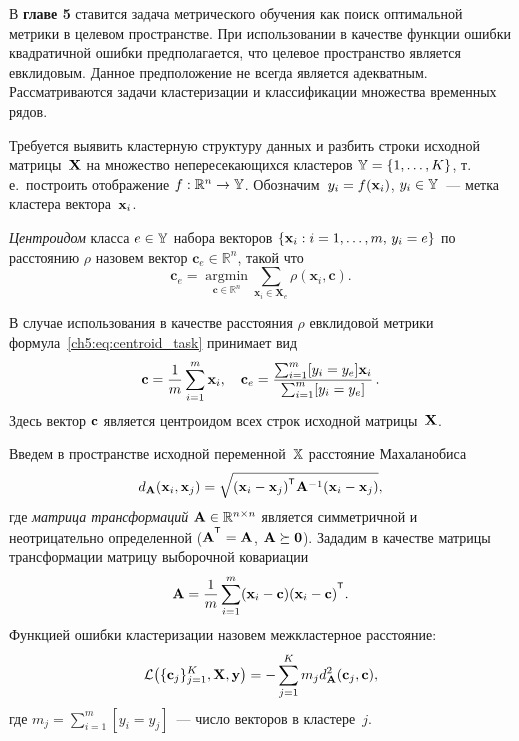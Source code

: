 \documentclass[11pt, a5paper]{dissert}
\begin{document}
В \textbf{главе 5} ставится задача метрического обучения как поиск оптимальной метрики в целевом пространстве.
При использовании в качестве функции ошибки квадратичной ошибки предполагается, что целевое пространство является евклидовым. 
Данное предположение не всегда является адекватным.
Рассматриваются задачи кластеризации и классификации множества временных рядов.

Требуется выявить кластерную структуру данных и разбить строки исходной матрицы~$\mathbf{X}$ на множество непересекающихся кластеров $\mathbb{Y} = \{1, \dots, K\}$, т.\,е.\ построить отображение $f: \mathbb{R}^n \to \mathbb{Y}$.
Обозначим~$y_i = f (\mathbf{x}_i)$, $y_i \in \mathbb{Y}$~--- метка кластера вектора~$\mathbf{x}_i$.
\begin{definition}
	\label{ch5:def:centroid}
	\textit{Центроидом} класса $e \in \mathbb{Y}$ набора векторов $\{\mathbf{x}_i: i=1, \dots, m, \, y_i=e\}$ по расстоянию $\rho$ назовем вектор $\mathbf{c}_e \in \mathbb{R}^n$, такой что
	\begin{equation}
		\label{ch5:eq:centroid_task}
		\mathbf{c}_e = \mathop{\text{argmin}}\limits_{{\mathbf{c} \in \mathbb{R}^n}}\sum_{\mathbf{x}_i \in \mathbf{X}_e}
		{\rho(\mathbf{x}_i ,\mathbf{c})}.
	\end{equation}
\end{definition}
В случае использования в качестве расстояния $\rho$ евклидовой метрики формула~\eqref{ch5:eq:centroid_task} принимает вид
\begin{equation}
	\label{ch5:eq:mu}
	\mathbf{c} =\frac{1}{m} \sum_{i=1}^m\mathbf{x}_i, \quad
	\mathbf{c}_e =\frac{ \sum_{i=1}^m [y_i = y_e]\mathbf{x}_i } {\sum_{i=1}^m [y_i = y_e]}\,.
\end{equation}
Здесь вектор $\mathbf{c}$ является центроидом всех строк исходной матрицы~$\mathbf{X}$.

Введем в пространстве исходной переменной~$\mathbb{X}$ расстояние Махаланобиса
\begin{equation}
	d_{\bA} (\bx_i, \bx_j) = \sqrt{(\bx_i - \bx_j)^{\T} \bA^{-1} (\bx_i - \bx_j)},
	\label{ch5:eq:mahal_distance}
\end{equation}
где \textit{матрица трансформаций} $\mathbf{A} \in \mathbb{R}^{n \times n}$ является симметричной и неотрицательно определенной ($\mathbf{A}^{\T} = \mathbf{A}$, $\mathbf{A} \succeq \boldsymbol{0}$).
Зададим в качестве матрицы трансформации матрицу выборочной ковариации
\begin{equation}
	\label{ch5:eq:covMatrix}
	\bA = \frac{1}{m} \sum_{i=1}^m(\bx_i - \bc)(\bx_i - \bc)^{\T}.
\end{equation}
Функцией ошибки кластеризации назовем межкластерное расстояние:
\begin{equation}
	\mathcal{L} \bigl(\{\mathbf{c}_j\}_{j=1}^K, \mathbf{X}, \mathbf{y}\bigr)= - \sum_{j=1}^K m_j d_{\mathbf{A}}^2(\mathbf{c}_j, \mathbf{c}),
	\label{ch5:eq:cluster_error_function}
\end{equation}
где $m_j = \sum_{i=1}^m [y_i = y_j]$~--- число векторов в кластере~$j$.
\end{document}
